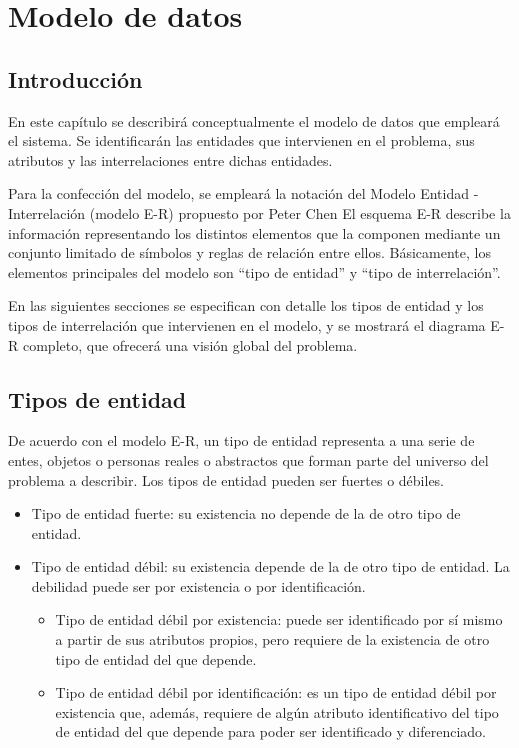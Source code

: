 \chapter{Modelo de datos} \label{cap:modelo_de_datos}

\section{Introducción}

En este capítulo se describirá conceptualmente el modelo de datos que empleará el sistema. Se identificarán las entidades que intervienen en el problema, sus atributos y las interrelaciones entre dichas entidades.

Para la confección del modelo, se empleará la notación del Modelo Entidad - Interrelación (modelo E-R) propuesto por Peter Chen%
El esquema E-R describe la información representando los distintos elementos que la componen mediante un conjunto limitado de símbolos y reglas de relación entre ellos. Básicamente, los elementos principales del modelo son “tipo de entidad” y “tipo de interrelación”.

En las siguientes secciones se especifican con detalle los tipos de entidad y los tipos de interrelación que intervienen en el modelo, y se mostrará el diagrama E-R completo, que ofrecerá una visión global del problema.

\section{Tipos de entidad} \label{sec:entidades}

De acuerdo con el modelo E-R, un tipo de entidad representa a una serie de entes, objetos o personas reales o abstractos que forman parte del universo del problema a describir. Los tipos de entidad pueden ser fuertes o débiles.

\begin{itemize}

    \item Tipo de entidad fuerte: su existencia no depende de la de otro tipo de entidad.

    \item Tipo de entidad débil: su existencia depende de la de otro tipo de entidad. La debilidad puede ser por existencia o por identificación.

    \begin{itemize}
        \item Tipo de entidad débil por existencia: puede ser identificado por sí mismo a partir de sus atributos propios, pero requiere de la existencia de otro tipo de entidad del que depende.

        \item Tipo de entidad débil por identificación: es un tipo de entidad débil por existencia que, además, requiere de algún atributo identificativo del tipo de entidad del que depende para poder ser identificado y diferenciado.
    \end{itemize} 
\end{itemize}    


